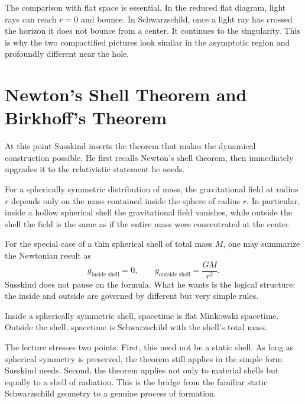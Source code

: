 The comparison with flat space is essential. In the reduced flat diagram, light rays can reach \(r=0\) and bounce. In Schwarzschild, once a light ray has crossed the horizon it does not bounce from a center. It continues to the singularity. This is why the two compactified pictures look similar in the asymptotic region and profoundly different near the hole.

\section{Newton's Shell Theorem and Birkhoff's Theorem}

At this point Susskind inserts the theorem that makes the dynamical construction possible. He first recalls Newton's shell theorem, then immediately upgrades it to the relativistic statement he needs.

\begin{theorem}
For a spherically symmetric distribution of mass, the gravitational field at radius \(r\) depends only on the mass contained inside the sphere of radius \(r\). In particular, inside a hollow spherical shell the gravitational field vanishes, while outside the shell the field is the same as if the entire mass were concentrated at the center.
\end{theorem}

For the special case of a thin spherical shell of total mass \(M\), one may summarize the Newtonian result as
\begin{equation}
g_{\text{inside shell}}=0,
\qquad
g_{\text{outside shell}}=\frac{GM}{r^2}.
\end{equation}
Susskind does not pause on the formula. What he wants is the logical structure: the inside and outside are governed by different but very simple rules.

\begin{theorem}
Inside a spherically symmetric shell, spacetime is flat Minkowski spacetime. Outside the shell, spacetime is Schwarzschild with the shell's total mass.
\end{theorem}

The lecture stresses two points. First, this need not be a static shell. As long as spherical symmetry is preserved, the theorem still applies in the simple form Susskind needs. Second, the theorem applies not only to material shells but equally to a shell of radiation. This is the bridge from the familiar static Schwarzschild geometry to a genuine process of formation.

